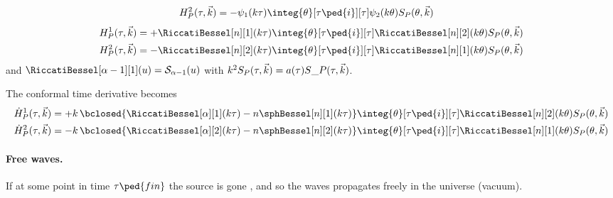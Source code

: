 \begin{draft}
{\begin{align}
        H_P^2(\tau, \vec{k}) &= -\psi_1(k\tau) \integ{\theta}[\tau\ped{i}][\tau]  \psi_2(k\theta) \Src_P(\theta, \vec{k})
    \end{align}
    \begin{align}
        H_P^1(\tau, \vec{k}) &= +\RiccatiBessel[n][1](k\tau) \integ{\theta}[\tau\ped{i}][\tau]  \RiccatiBessel[n][2](k\theta)  \Src_P(\theta, \vec{k}) \\
        H_P^2(\tau, \vec{k}) &= -\RiccatiBessel[n][2](k\tau) \integ{\theta}[\tau\ped{i}][\tau]  \RiccatiBessel[n][1](k\theta) \Src_P(\theta, \vec{k})
    \end{align}
    and $\RiccatiBessel[\alpha-1][1](u) = \mathcal{S}_{\alpha-1}(u) $
    with $k^2S_P(\tau, \vec{k}) = a(\tau) S\_P(\tau, \vec{k})$.
    


    The conformal time derivative becomes
    \begin{equation}
        \begin{split}
            \dot{H}_P^1(\tau, \vec{k})  &= +k \,\bclosed{ \RiccatiBessel[\alpha][1](k\tau) -  n\sphBessel[n][1](k\tau) } \integ{\theta}[\tau\ped{i}][\tau]  \RiccatiBessel[n][2](k\theta)  \Src_P(\theta, \vec{k})  \\
            \dot{H}_P^2(\tau, \vec{k})  &= -k \,\bclosed{ \RiccatiBessel[\alpha][2](k\tau) -  n\sphBessel[n][2](k\tau) } \integ{\theta}[\tau\ped{i}][\tau]  \RiccatiBessel[n][1](k\theta)  \Src_P(\theta, \vec{k})  
        \end{split}
    \end{equation}

    \paragraph{Free waves.} %
    If at some point in time $\tau\ped{fin}$ the source is gone \blahblah, and so the waves propagates freely in the universe (vacuum).
        }
\end{draft}






